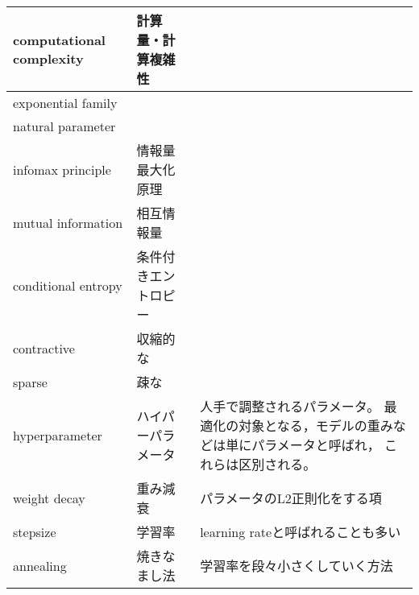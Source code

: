 \documentclass[dvipdfmx, fleqn]{jsarticle}
\begin{document}
\begin{longtable}{p{4cm}p{4cm}p{7cm}}
            \tabularnewline \hline
        computational complexity
            & 計算量・計算複雑性
            & 
            \tabularnewline \hline
        exponential family
            & 
            & 
            \tabularnewline \hline
        natural parameter
            & 
            & 
            \tabularnewline \hline
        infomax principle
            & 情報量最大化原理
            & 
            \tabularnewline \hline
        mutual information
            & 相互情報量
            & 
            \tabularnewline \hline
        conditional entropy
            & 条件付きエントロピー
            & 
            \tabularnewline \hline
        contractive
            & 収縮的な
            & 
            \tabularnewline \hline
        sparse
            & 疎な
            & 
            \tabularnewline \hline
        hyperparameter
            & ハイパーパラメータ
            & 人手で調整されるパラメータ。
            最適化の対象となる，モデルの重みなどは単にパラメータと呼ばれ，
            これらは区別される。
            \tabularnewline \hline
        weight decay
            & 重み減衰
            & パラメータのL2正則化をする項
            \tabularnewline \hline
        stepsize
            & 学習率
            & learning rateと呼ばれることも多い
            \tabularnewline \hline
        annealing
            & 焼きなまし法
            & 学習率を段々小さくしていく方法
            \tabularnewline \hline
\end{longtable}
\end{document}
